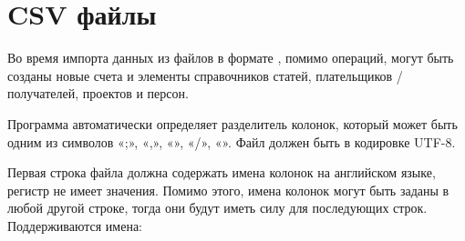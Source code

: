 \documentclass[a4paper,10pt,russian]{sphinxmanual}
\begin{document}
\noindent{}
\noindent{}
\noindent{}
\noindent{}
\noindent{}
\noindent{}
\noindent{}
\noindent{}


\section{CSV файлы}
\label{\detokenize{import:id3}}
Во время импорта данных из файлов в формате , помимо операций, могут быть созданы новые
счета и элементы справочников статей, плательщиков / получателей, проектов и персон.

Программа автоматически определяет разделитель колонок, который может быть одним из символов «;», «,», «\textbar{}», «/», «».
Файл должен быть в кодировке UTF-8.

Первая строка файла должна содержать имена колонок на английском языке, регистр не имеет значения. Помимо этого, имена
колонок могут быть заданы в любой другой строке, тогда они будут иметь силу для последующих строк. Поддерживаются имена:
\end{document}
